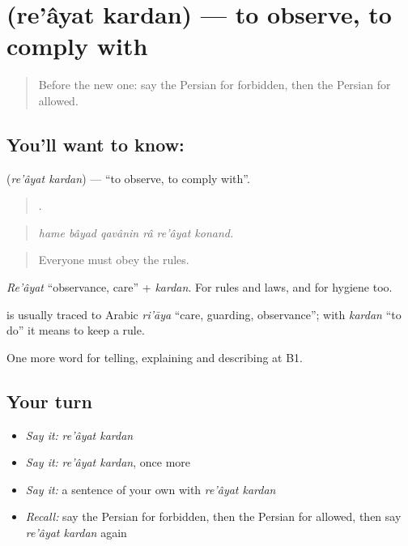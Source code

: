 \section[\texorpdfstring{\fa{رعایت} \fa{کردن} (re'âyat kardan)}{رعایت کردن (re'âyat kardan)}]{  (re'âyat kardan) — to observe, to comply with}

\label{lesson:FA-C404-reayat-kardan}



\begin{quote}
Before the new one: say the Persian for forbidden, then the Persian for allowed.
\end{quote}

\subsection*{You'll want to know:  }
\textbf{ } (\emph{re'âyat kardan}) — \textquotedblleft{}to observe, to comply with\textquotedblright{}.

\begin{quote}
     .
\end{quote}

\begin{quote}
\emph{hame bâyad qavânin râ re'âyat konand.}
\end{quote}

\begin{quote}
Everyone must obey the rules.
\end{quote}

\emph{Re'âyat} \textquotedblleft{}observance, care\textquotedblright{} + \emph{kardan}. For rules and laws, and for hygiene too.

\begin{cousinweb}
\textbf{} is usually traced to Arabic \emph{ri'āya} \textquotedblleft{}care, guarding, observance\textquotedblright{}; with \emph{kardan} \textquotedblleft{}to do\textquotedblright{} it means to keep a rule.
\end{cousinweb}

\begin{grammarlens}[title={What you've built}]
One more word for telling, explaining and describing at B1.
\end{grammarlens}

\subsection*{Your turn}
\begin{itemize}
\raggedright
  \item \emph{Say it:} \emph{re'âyat kardan}
  \item \emph{Say it:} \emph{re'âyat kardan}, once more
  \item \emph{Say it:} a sentence of your own with \emph{re'âyat kardan}
  \item \emph{Recall:} say the Persian for forbidden, then the Persian for allowed, then say \emph{re'âyat kardan} again
\end{itemize}

